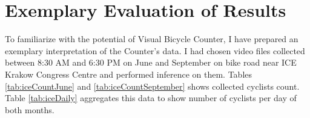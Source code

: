 \chapter{Exemplary Evaluation of Results}
\label{cha:results}
To familiarize with the potential of Visual Bicycle Counter, I have prepared an exemplary interpretation of the Counter's data. I had chosen video files collected between 8:30 AM and 6:30 PM on June and September on bike road near ICE Krakow Congress Centre and performed inference on them. Tables \ref{tab:iceCountJune} and \ref{tab:iceCountSeptember} shows collected cyclists count. Table \ref{tab:iceDaily} aggregates this data to show number of cyclists per day of both months.
\begin{table}[H]
\centering
{}
\end{table}

